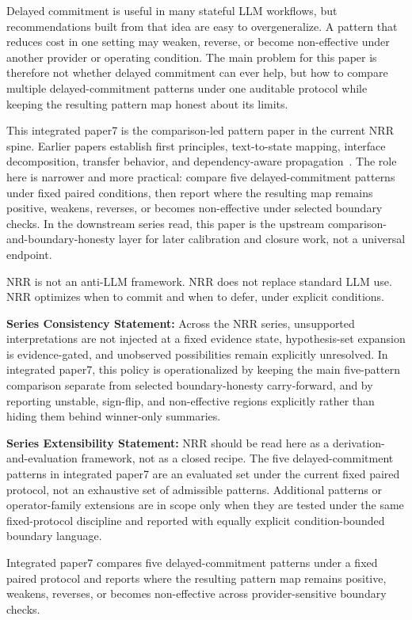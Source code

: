 \documentclass[11pt,a4paper]{article}
\begin{document}
Delayed commitment is useful in many stateful LLM workflows, but recommendations built from that idea are easy to overgeneralize. A pattern that reduces cost in one setting may weaken, reverse, or become non-effective under another provider or operating condition. The main problem for this paper is therefore not whether delayed commitment can ever help, but how to compare multiple delayed-commitment patterns under one auditable protocol while keeping the resulting pattern map honest about its limits.

This integrated paper7 is the comparison-led pattern paper in the current NRR spine. Earlier papers establish first principles, text-to-state mapping, interface decomposition, transfer behavior, and dependency-aware propagation~\cite{saito2025nrr,saito2026phi,saito2026ime,saito2026transfer,saito2026coupled}. The role here is narrower and more practical: compare five delayed-commitment patterns under fixed paired conditions, then report where the resulting map remains positive, weakens, reverses, or becomes non-effective under selected boundary checks. In the downstream series read, this paper is the upstream comparison-and-boundary-honesty layer for later calibration and closure work, not a universal endpoint.

NRR is not an anti-LLM framework.
NRR does not replace standard LLM use.
NRR optimizes when to commit and when to defer, under explicit conditions.

\textbf{Series Consistency Statement:}
Across the NRR series, unsupported interpretations are not injected at a fixed evidence state, hypothesis-set expansion is evidence-gated, and unobserved possibilities remain explicitly unresolved. In integrated paper7, this policy is operationalized by keeping the main five-pattern comparison separate from selected boundary-honesty carry-forward, and by reporting unstable, sign-flip, and non-effective regions explicitly rather than hiding them behind winner-only summaries.

\textbf{Series Extensibility Statement:}
NRR should be read here as a derivation-and-evaluation framework, not as a closed recipe. The five delayed-commitment patterns in integrated paper7 are an evaluated set under the current fixed paired protocol, not an exhaustive set of admissible patterns. Additional patterns or operator-family extensions are in scope only when they are tested under the same fixed-protocol discipline and reported with equally explicit condition-bounded boundary language.

Integrated paper7 compares five delayed-commitment patterns under a fixed paired protocol and reports where the resulting pattern map remains positive, weakens, reverses, or becomes non-effective across provider-sensitive boundary checks.
\end{document}
